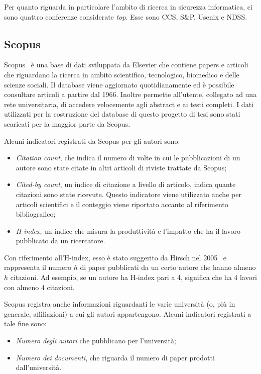 Per quanto riguarda in particolare l'ambito di ricerca in sicurezza informatica,
ci sono quattro conferenze considerate \textit{top}. Esse sono CCS, S\&P, Usenix
e NDSS.


\subsection{Scopus}\label{sec:scopus}

Scopus~\cite{scopus} è una base di dati sviluppata da Elsevier che contiene
papers e articoli che riguardano la ricerca in ambito scientifico, tecnologico,
biomedico e delle scienze sociali. Il database viene aggiornato quotidianamente
ed è possibile consultare articoli a partire dal 1966. Inoltre permette
all'utente, collegato ad una rete universitaria, di accedere velocemente agli
abstract e ai testi completi.
I dati utilizzati per la costruzione del database di questo progetto di tesi sono stati scaricati per la maggior parte da Scopus. 

Alcuni indicatori registrati da Scopus per gli autori sono:
\begin{itemize}
    \item \textit{Citation count}, che indica il numero di volte in cui le
    pubblicazioni di un autore sono state citate in altri articoli di riviste
    trattate da Scopus;
    \item \textit{Cited-by count}, un indice di citazione a livello di articolo,
    indica quante citazioni sono state ricevute. Questo indicatore viene
    utilizzato anche per articoli scientifici e il conteggio viene riportato
    accanto al riferimento bibliografico;
    \item \textit{H-index}, un indice che misura la produttività e l'impatto che
    ha il lavoro pubblicato da un ricercatore.
\end{itemize}

Con riferimento all'H-index, esso è stato suggerito da Hirsch nel 2005~\cite{hirsch2005}
e rappresenta il numero $h$ di paper pubblicati da un certo autore che hanno
almeno $h$ citazioni. Ad esempio, se un autore ha H-index pari a 4, significa
che ha 4 lavori con almeno 4 citazioni.

Scopus registra anche informazioni riguardanti le varie università (o, più
in generale, affiliazioni) a cui gli autori appartengono. Alcuni indicatori
registrati a tale fine sono:
\begin{itemize}
    \item \textit{Numero degli autori} che pubblicano per l'università;
    \item \textit{Numero dei documenti}, che riguarda il numero di paper prodotti dall'università.
\end{itemize}


